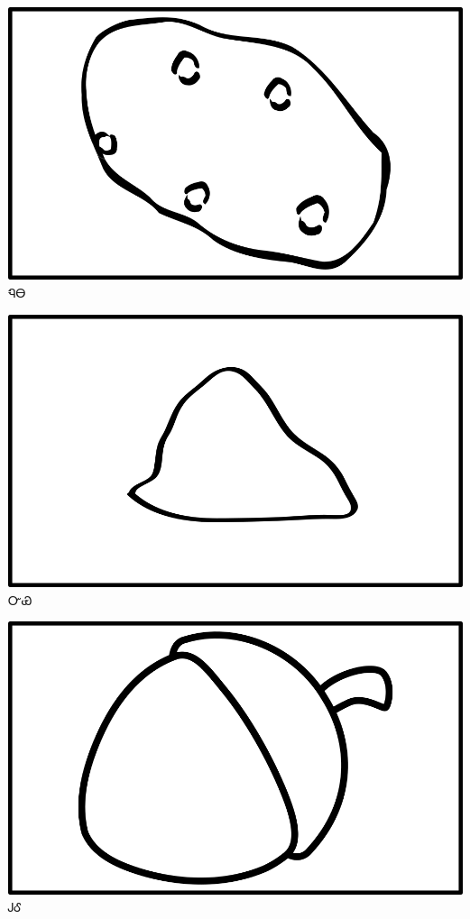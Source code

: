 \documentclass[avery5371]{flashcards}%
\begin{document}

\begin{flashcard}{
\includegraphics[width=0.95\columnwidth,height=.51\columnwidth,keepaspectratio]{../artwork/objects-neutral/nuna}
}
\Huge ᏄᎾ
\end{flashcard}

\begin{flashcard}{
\includegraphics[width=0.95\columnwidth,height=.51\columnwidth,keepaspectratio]{../artwork/objects-neutral/nvya}
}
\Huge ᏅᏯ
\end{flashcard}

\begin{flashcard}{
\includegraphics[width=0.95\columnwidth,height=.51\columnwidth,keepaspectratio]{../artwork/objects-neutral/gule}
}
\Huge ᎫᎴ
\end{flashcard}
\end{document}
